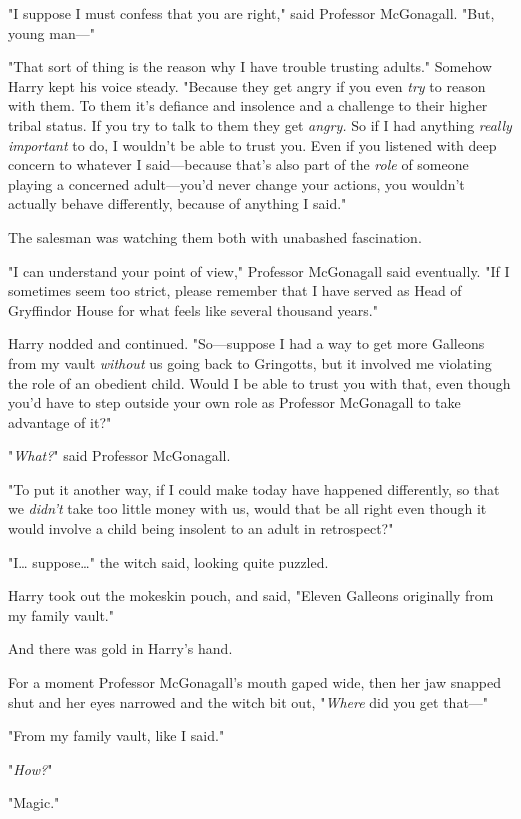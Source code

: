 "I suppose I must confess that you are right," said Professor McGonagall. "But, 
young man---"

"That sort of thing is the reason why I have trouble trusting adults." Somehow 
Harry kept his voice steady. "Because they get angry if you even \emph{try} to 
reason with them. To them it's defiance and insolence and a challenge to their 
higher tribal status. If you try to talk to them they get \emph{angry.} So if I 
had anything \emph{really important} to do, I wouldn't be able to trust you. 
Even if you listened with deep concern to whatever I said---because that's also 
part of the \emph{role} of someone playing a concerned adult---you'd never 
change your actions, you wouldn't actually behave differently, because of 
anything I said."

The salesman was watching them both with unabashed fascination.

"I can understand your point of view," Professor McGonagall said eventually. 
"If I sometimes seem too strict, please remember that I have served as Head of 
Gryffindor House for what feels like several thousand years."

Harry nodded and continued. "So---suppose I had a way to get more Galleons from 
my vault \emph{without} us going back to Gringotts, but it involved me 
violating the role of an obedient child. Would I be able to trust you with 
that, even though you'd have to step outside your own role as Professor 
McGonagall to take advantage of it?"

"\emph{What?}" said Professor McGonagall.

"To put it another way, if I could make today have happened differently, so 
that we \emph{didn't} take too little money with us, would that be all right 
even though it would involve a child being insolent to an adult in retrospect?"

"I{\ldots} suppose{\ldots}" the witch said, looking quite puzzled.

Harry took out the mokeskin pouch, and said, "Eleven Galleons originally from 
my family vault."

And there was gold in Harry's hand.

For a moment Professor McGonagall's mouth gaped wide, then her jaw snapped shut 
and her eyes narrowed and the witch bit out, "\emph{Where} did you get that---"

"From my family vault, like I said."

"\emph{How?}"

"Magic."

